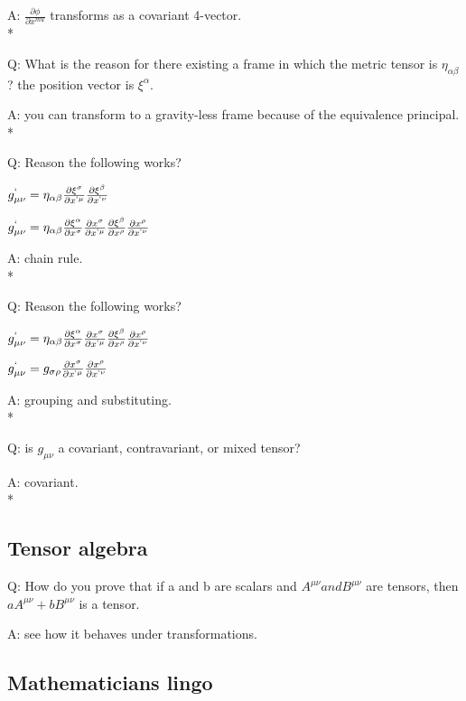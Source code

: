\documentclass{article}
\begin{document}
A: $\frac{\partial\phi}{\partial x^{mu}}$ transforms as a covariant 4-vector. 
\\*

Q: What is the reason for there existing a frame in which the metric tensor is $\eta_{\alpha\beta}$? the position vector is $\xi^{\alpha}$.

A: you can transform to a gravity-less frame because of the equivalence principal.
\\*

Q: Reason the following works?

$g^{`}_{\mu\nu}=\eta_{\alpha\beta}\frac{\partial \xi^{\sigma}}{\partial x^{`\mu}}\frac{\partial \xi^{\beta}}{\partial x^{`\nu}}$

$g^{`}_{\mu\nu}=\eta_{\alpha\beta}\frac{\partial \xi^{\alpha}}{\partial x^{\sigma}}\frac{\partial x^{\sigma}}{\partial x^{`\mu}}\frac{\partial \xi^{\beta}}{\partial x^{\rho}}\frac{\partial x^{\rho}}{\partial x^{`\nu}}$

A: chain rule.
\\*

Q: Reason the following works?

$g^{`}_{\mu\nu}=\eta_{\alpha\beta}\frac{\partial \xi^{\alpha}}{\partial x^{\sigma}}\frac{\partial x^{\sigma}}{\partial x^{`\mu}}\frac{\partial \xi^{\beta}}{\partial x^{\rho}}\frac{\partial x^{\rho}}{\partial x^{`\nu}}$

$g^{`}_{\mu\nu}=g_{\sigma\rho}\frac{\partial x^{\sigma}}{\partial x^{`\mu}}\frac{\partial x^{\rho}}{\partial x^{`\nu}}$

A: grouping and substituting.
\\*

Q: is $g_{\mu\nu}$ a covariant, contravariant, or mixed tensor?

A: covariant.
\\*

\subsection{Tensor algebra}

\hspace{0.5cm}Q: How do you prove that if a and b are scalars and $A^{\mu\nu} and B^{\mu\nu}$ are tensors, then $aA^{\mu\nu}+bB^{\mu\nu}$ is a tensor.

A: see how it behaves under transformations. 

\subsection{Mathematicians lingo}
\end{document}
